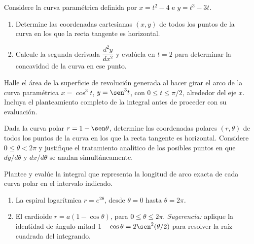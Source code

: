 
\begin{prob}
Considere la curva paramétrica definida por $x = t^2 - 4$ e $y = t^3 - 3t$.
\begin{enumerate}
    \item Determine las coordenadas cartesianas $(x, y)$ de todos los puntos
          de la curva en los que la recta tangente es horizontal.
    \item Calcule la segunda derivada $\dfrac{d^2y}{dx^2}$ y evalúela en
          $t = 2$ para determinar la concavidad de la curva en ese punto.
\end{enumerate}
\end{prob}

\begin{prob}
Halle el área de la superficie de revolución generada al hacer girar el arco
de la curva paramétrica $x = \cos^3 t$, $y = \sen^3 t$, con
$0 \leq t \leq \pi/2$, alrededor del eje $x$. Incluya el planteamiento
completo de la integral antes de proceder con su evaluación.
\end{prob}

\begin{prob}
Dada la curva polar $r = 1 - \sen\theta$, determine las coordenadas polares
$(r,\theta)$ de todos los puntos de la curva en los que la recta tangente es
horizontal. Considere $0 \leq \theta < 2\pi$ y justifique el tratamiento
analítico de los posibles puntos en que $dy/d\theta$ y $dx/d\theta$ se
anulan simultáneamente.
\end{prob}

\begin{prob}
Plantee y evalúe la integral que representa la longitud de arco exacta de
cada curva polar en el intervalo indicado.
\begin{enumerate}
    \item La espiral logarítmica $r = e^{2\theta}$, desde $\theta = 0$
          hasta $\theta = 2\pi$.
    \item El cardioide $r = a(1 - \cos\theta)$, para $0 \leq \theta \leq 2\pi$.
          \emph{Sugerencia:} aplique la identidad de ángulo mitad
          $1 - \cos\theta = 2\sen^2(\theta/2)$ para resolver la raíz
          cuadrada del integrando.
\end{enumerate}
\end{prob}



